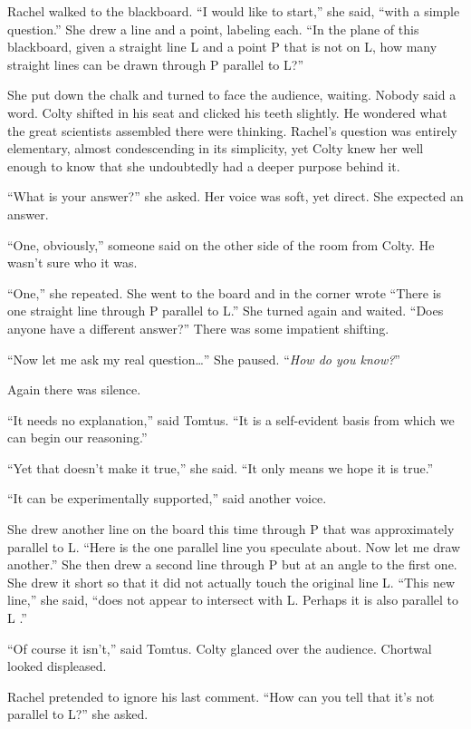 
Rachel walked to the blackboard. ``I would like to start,'' she said, ``with a simple
question.'' She drew a line and a point, labeling each. ``In the plane of this blackboard, given
a straight line L and a point P that is not on L, how many straight lines can be drawn through P
parallel to L?''

She put down the chalk and turned to face the audience, waiting. Nobody said a word. Colty
shifted in his seat and clicked his teeth slightly. He wondered what the great scientists
assembled there were thinking. Rachel's question was entirely elementary, almost condescending
in its simplicity, yet Colty knew her well enough to know that she undoubtedly had a deeper
purpose behind it.

``What is your answer?'' she asked. Her voice was soft, yet direct. She expected an answer.

``One, obviously,'' someone said on the other side of the room from Colty. He wasn't sure
who it was.

``One,'' she repeated. She went to the board and in the corner wrote ``There is one straight
line through P parallel to L.'' She turned again and waited. ``Does anyone have a different
answer?'' There was some impatient shifting.

``Now let me ask my real question\ldots'' She paused. ``\emph{How do you know?}''

Again there was silence.

``It needs no explanation,'' said Tomtus. ``It is a self-evident basis from which we can
begin our reasoning.''

``Yet that doesn't make it true,'' she said. ``It only means we hope it is true.''

``It can be experimentally supported,'' said another voice.

She drew another line on the board this time through P that was approximately parallel to L.
``Here is the one parallel line you speculate about. Now let me draw another.'' She then drew a
second line through P but at an angle to the first one. She drew it short so that it did not
actually touch the original line L. ``This new line,'' she said, ``does not appear to intersect
with L. Perhaps it is also parallel to L .''

``Of course it isn't,'' said Tomtus. Colty glanced over the audience. Chortwal looked
displeased.

Rachel pretended to ignore his last comment. ``How can you tell that it's not parallel to
L?'' she asked.

